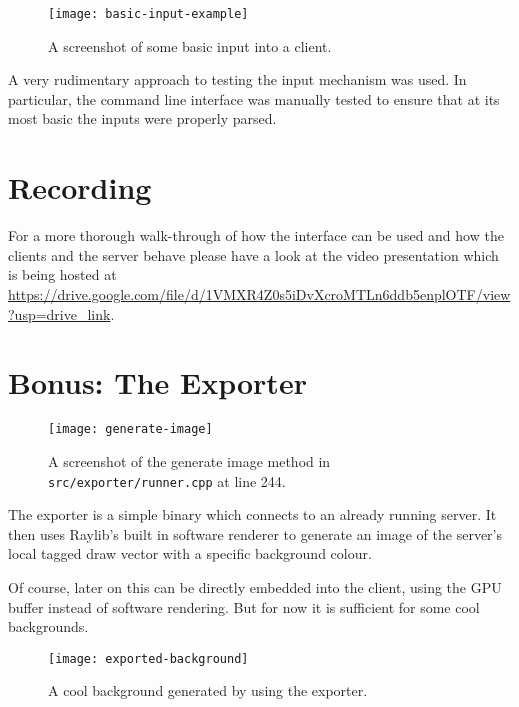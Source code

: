 \documentclass[article]{uom-coursework}
\begin{document}
\begin{figure}[H]
\centering
\texttt{[image: basic-input-example]}
\caption{A screenshot of some basic input into a client.}
\end{figure}

A very rudimentary approach to testing the input mechanism was
used. In particular, the command line interface was manually
tested to ensure that at its most basic the inputs were properly
parsed.

\section{Recording}

For a more thorough walk-through of how the interface can be
used and how the clients and the server behave please have a
look at the video presentation which is being hosted at
\url{https://drive.google.com/file/d/1VMXR4Z0s5iDvXcroMTLn6ddb5enplOTF/view?usp=drive_link}.

\section{\textbf{Bonus}: The Exporter}

\begin{figure}[H]
\centering
\texttt{[image: generate-image]}
\caption{A screenshot of the generate image method in
\texttt{src/exporter/runner.cpp} at line 244.}
\end{figure}

The exporter is a simple binary which connects to an already
running server. It then uses Raylib's built in software renderer
to generate an image of the server's local tagged draw vector
with a specific background colour.

Of course, later on this can be directly embedded into the
client, using the GPU buffer instead of software rendering. But
for now it is sufficient for some cool backgrounds.

\begin{figure}[H]
\centering
\texttt{[image: exported-background]}
\caption{A cool background generated by using the exporter.}
\end{figure}
\end{document}
